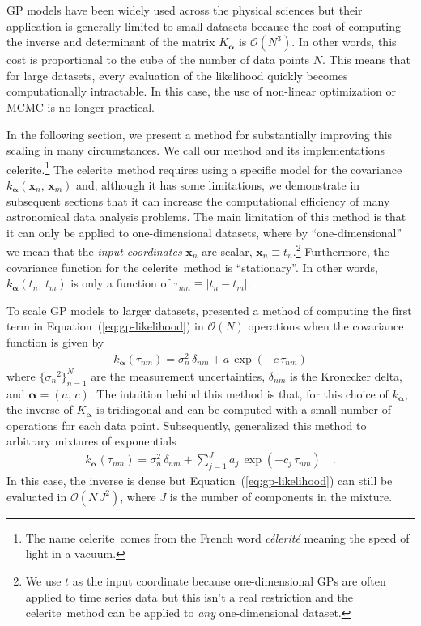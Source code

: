 \documentclass[manuscript, letterpaper]{aastex6}
\makeatletter
\let\origsection\section
\renewcommand\section{\@ifstar{\starsection}{\nostarsection}}
\newcommand\nostarsection[1]{\sectionprelude\origsection{#1}}
\newcommand\starsection[1]{\sectionprelude\origsection*{#1}}
\newcommand\sectionprelude{\vspace{1em}}
\newcommand{\project}[1]{\textsf{#1}}
\newcommand{\celerite}{\project{celerite}}
\newcommand{\foreign}[1]{\emph{#1}}
\renewcommand{\eqref}[1]{\ref{eq:#1}}
\newcommand{\Eq}[1]{Equation~(\eqref{#1})}
\newcommand{\eq}[1]{\Eq{#1}}
\newcommand{\eqlabel}[1]{\label{eq:#1}}
\newcommand{\bvec}[1]{{\ensuremath{\boldsymbol{#1}}}}
\makeatother
\begin{document}
GP models have been widely used across the physical sciences but their
application is generally limited to small datasets because the cost of
computing the inverse and determinant of the matrix $K_\bvec{\alpha}$ is
$\mathcal{O}(N^3)$.
In other words, this cost is proportional to the cube of the number of data
points $N$.
This means that for large datasets, every evaluation of the likelihood
quickly becomes computationally intractable.
In this case, the use of non-linear optimization or MCMC is no longer
practical.

In the following section, we present a method for substantially improving this
scaling in many circumstances.
We call our method and its implementations \celerite.\footnote{The name
\celerite\ comes from the French word \foreign{c\'elerit\'e} meaning the speed
of light in a vacuum.} The \celerite\ method requires using a specific model
for the covariance $k_\bvec{\alpha}(\bvec{x}_n,\,\bvec{x}_m)$ and, although it
has some limitations, we demonstrate in subsequent sections that it can
increase the computational efficiency of many astronomical data analysis
problems.
The main limitation of this method is that it can only be applied to
one-dimensional datasets, where by ``one-dimensional'' we mean that the
 \emph{input coordinates} $\bvec{x}_n$ are scalar, $\bvec{x}_n \equiv
t_n$.\footnote{We use $t$ as the input coordinate because
one-dimensional GPs are often applied to time series data but this isn't a
real restriction and the \celerite\ method can be applied to \emph{any}
one-dimensional dataset.}
Furthermore, the covariance function for the \celerite\ method is
``stationary''.
In other words, $k_\bvec{\alpha}(t_n,\,t_m)$ is only a function of $\tau_{nm}
\equiv |t_n - t_m|$.


\section{The celerite model}

To scale GP models to larger datasets, \citet{Rybicki:1995} presented a method
of computing the first term in \eq{gp-likelihood} in $\mathcal{O}(N)$
operations when the covariance function is given by
\begin{eqnarray}\eqlabel{kernel-simple}
k_\bvec{\alpha}(\tau_{nm}) = \sigma_n^2\,\delta_{nm} + a\,\exp(-c\,\tau_{nm})
\end{eqnarray}
where $\{{\sigma_n}^2\}_{n=1}^N$ are the measurement uncertainties,
$\delta_{nm}$ is the Kronecker delta, and $\bvec{\alpha} = (a,\,c)$.
The intuition behind this method is that, for this choice of $k_\bvec{\alpha}$,
the inverse of $K_\bvec{\alpha}$ is tridiagonal and can be computed
with a small number of operations for each data point.
Subsequently, \citet{Ambikasaran:2015} generalized this method to arbitrary
mixtures of exponentials
\begin{eqnarray}
k_\bvec{\alpha}(\tau_{nm}) = \sigma_n^2\,\delta_{nm} +
    \sum_{j=1}^J a_j\,\exp(-c_j\,\tau_{nm})\quad.
\end{eqnarray}
In this case, the inverse is dense but \eq{gp-likelihood} can still be
evaluated in $\mathcal{O}(N\,J^2)$, where $J$ is the number of components
in the mixture.
\end{document}
